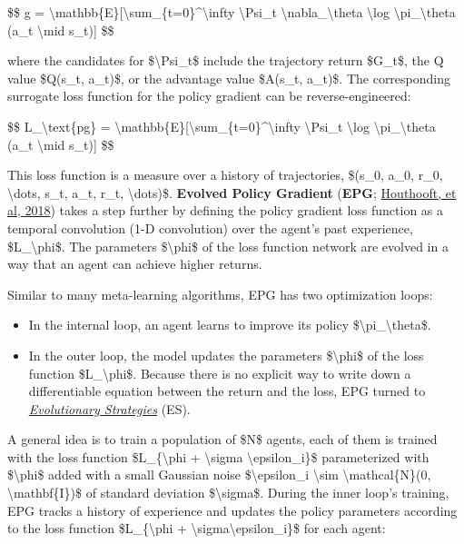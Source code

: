 \$\$ g = \textbackslash mathbb\{E\}{[}\textbackslash sum\_\{t=0\}\^{}\textbackslash infty \textbackslash Psi\_t \textbackslash nabla\_\textbackslash theta \textbackslash log \textbackslash pi\_\textbackslash theta (a\_t \textbackslash mid s\_t){]} \$\$

where the candidates for \$\textbackslash Psi\_t\$ include the trajectory return \$G\_t\$, the Q value \$Q(s\_t, a\_t)\$, or the advantage value \$A(s\_t, a\_t)\$. The corresponding surrogate loss function for the policy gradient can be reverse-engineered:

\$\$ L\_\textbackslash text\{pg\} = \textbackslash mathbb\{E\}{[}\textbackslash sum\_\{t=0\}\^{}\textbackslash infty \textbackslash Psi\_t \textbackslash log \textbackslash pi\_\textbackslash theta (a\_t \textbackslash mid s\_t){]} \$\$

This loss function is a measure over a history of trajectories, \$(s\_0, a\_0, r\_0, \textbackslash dots, s\_t, a\_t, r\_t, \textbackslash dots)\$. \textbf{Evolved Policy Gradient} (\textbf{EPG}; \href{https://papers.nips.cc/paper/7785-evolved-policy-gradients.pdf}{Houthooft, et al, 2018}) takes a step further by defining the policy gradient loss function as a temporal convolution (1-D convolution) over the agent's past experience, \$L\_\textbackslash phi\$. The parameters \$\textbackslash phi\$ of the loss function network are evolved in a way that an agent can achieve higher returns.

Similar to many meta-learning algorithms, EPG has two optimization loops:

\begin{itemize}
\tightlist
\item
  In the internal loop, an agent learns to improve its policy \$\textbackslash pi\_\textbackslash theta\$.
\item
  In the outer loop, the model updates the parameters \$\textbackslash phi\$ of the loss function \$L\_\textbackslash phi\$. Because there is no explicit way to write down a differentiable equation between the return and the loss, EPG turned to \href{https://en.wikipedia.org/wiki/Evolution_strategy}{\emph{Evolutionary Strategies}} (ES).
\end{itemize}

A general idea is to train a population of \$N\$ agents, each of them is trained with the loss function \$L\_\{\textbackslash phi + \textbackslash sigma \textbackslash epsilon\_i\}\$ parameterized with \$\textbackslash phi\$ added with a small Gaussian noise \$\textbackslash epsilon\_i \textbackslash sim \textbackslash mathcal\{N\}(0, \textbackslash mathbf\{I\})\$ of standard deviation \$\textbackslash sigma\$. During the inner loop's training, EPG tracks a history of experience and updates the policy parameters according to the loss function \$L\_\{\textbackslash phi + \textbackslash sigma\textbackslash epsilon\_i\}\$ for each agent:

